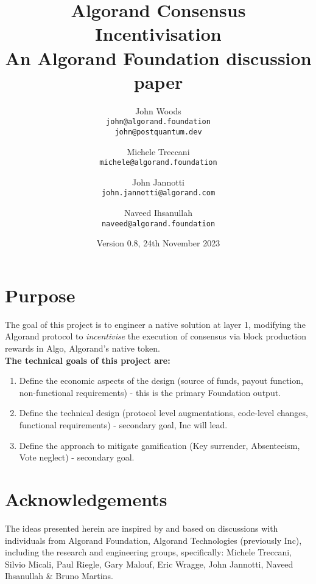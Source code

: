 \documentclass[11pt,a4paper]{article}
\begin{document}
\title {Algorand Consensus Incentivisation \\
       {\large \sc An Algorand Foundation discussion paper}}
\date  {Version 0.8, 24th November 2023}
\author{
    John Woods \\ 
    {\small \texttt{john@algorand.foundation}} \\
    {\small \texttt{john@postquantum.dev}} \\
\and 
    Michele Treccani \\
    {\small \texttt{michele@algorand.foundation}}
\and 
    John Jannotti \\
    {\small \texttt{john.jannotti@algorand.com}}
\and 
    Naveed Ihsanullah \\
    {\small \texttt{naveed@algorand.foundation}}
}

\maketitle

\section{Purpose}
The goal of this project is to engineer a native solution at layer 1, modifying the Algorand protocol to 
\emph{incentivise} the execution of consensus via block production rewards in Algo, Algorand's native token. \\

\textbf{The technical goals of this project are:}

\begin{enumerate}
    \item Define the economic aspects of the design (source of funds, payout function, non-functional requirements) - 
        this is the primary Foundation output.
    \item Define the technical design (protocol level augmentations, code-level changes, functional requirements) 
        - secondary goal, Inc will lead.
    \item Define the approach to mitigate gamification (Key surrender, Absenteeism, Vote neglect) - secondary goal.
\end{enumerate}

\pagebreak

\tableofcontents

\pagebreak

\section{Acknowledgements}
The ideas presented herein are inspired by and based on discussions with individuals from Algorand Foundation, 
Algorand Technologies (previously Inc), including the research and engineering groups, specifically: Michele Treccani, 
Silvio Micali, Paul Riegle, Gary Malouf, Eric Wragge, John Jannotti, Naveed Ihsanullah \& Bruno Martins.
\end{document}

